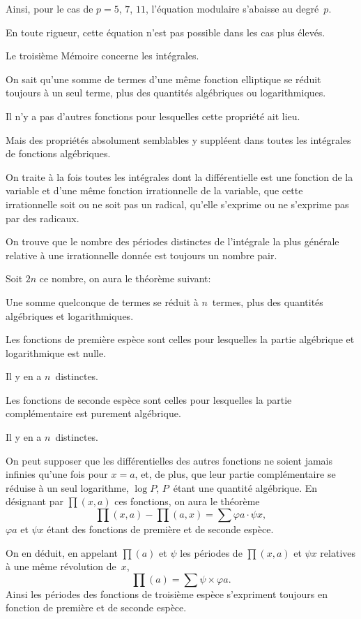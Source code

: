 \documentclass[leqno,12pt]{book}[2005/09/16]
\renewcommand{\phi}{\varphi}
\begin{document}
Ainsi, pour le cas de $p = 5$, $7$, $11$, l'équation modulaire
s'abaisse au degré~$p$.

En toute rigueur, cette équation n'est pas possible dans les cas
plus élevés.

Le troisième Mémoire concerne les intégrales.

On sait qu'une somme de termes d'une même fonction elliptique
se réduit toujours à un seul terme, plus des quantités algébriques
ou logarithmiques.

Il n'y a pas d'autres fonctions pour lesquelles cette propriété
ait lieu.

Mais des propriétés absolument semblables y suppléent dans
toutes les intégrales de fonctions algébriques.

On traite à la fois toutes les intégrales dont la différentielle est
une fonction de la variable et d'une même fonction irrationnelle
de la variable, que cette irrationnelle soit ou ne soit pas un radical,
qu'elle s'exprime ou ne s'exprime pas par des radicaux.

On trouve que le nombre des périodes distinctes de l'intégrale
la plus générale relative à une irrationnelle donnée est toujours
un nombre pair.

Soit $2n$ ce nombre, on aura le théorème suivant:

Une somme quelconque de termes se réduit à $n$~termes, plus
des quantités algébriques et logarithmiques.

Les fonctions de première espèce sont celles pour lesquelles la
partie algébrique et logarithmique est nulle.

Il y en a $n$~distinctes.

Les fonctions de seconde espèce sont celles pour lesquelles la
partie complémentaire est purement algébrique.

Il y en a $n$~distinctes.

On peut supposer que les différentielles des autres fonctions
ne soient jamais infinies qu'une fois pour $x = a$, et, de plus, que
leur partie complémentaire se réduise à un seul logarithme, $\log P$,
$P$~étant une quantité algébrique. En désignant par $\prod(x, a)$ ces
fonctions, on aura le théorème
\[
\textstyle \prod(x, a) - \prod(a, x) = \sum \phi a · \psi x,
\]
$\phi a$ et $\psi x$ étant des fonctions de première et de seconde espèce.

On en déduit, en appelant $\prod(a)$ et $\psi$ les périodes de $\prod(x, a)$
et $\psi x$ relatives à une même révolution de~$x$,
\[
\textstyle \prod(a) = \sum \psi × \phi a.
\]
Ainsi les périodes des fonctions de troisième espèce s'expriment
toujours en fonction de première et de seconde espèce.
\end{document}
